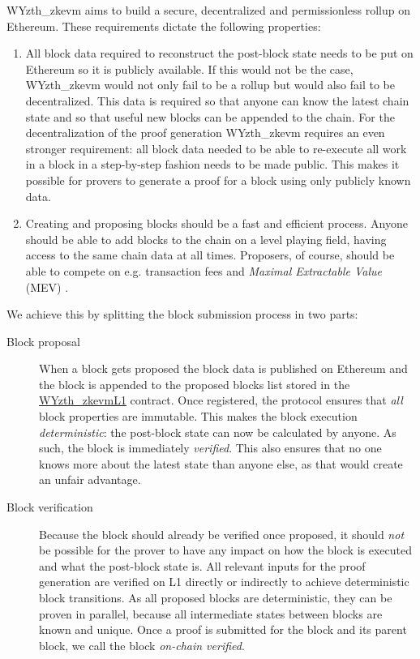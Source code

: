 \documentclass[9pt,oneside]{amsart}
\begin{document}
\begin{multicols}{2}
WYzth_zkevm aims to build a secure, decentralized and permissionless rollup on Ethereum. These requirements dictate the following properties:
\begin{enumerate}
\item All block data required to reconstruct the post-block state needs to be put on Ethereum so it is publicly available. If this would not be the case, WYzth_zkevm would not only fail to be a rollup but would also fail to be decentralized. This data is required so that anyone can know the latest chain state and so that useful new blocks can be appended to the chain. For the decentralization of the proof generation WYzth_zkevm requires an even stronger requirement: all block data needed to be able to re-execute all work in a block in a step-by-step fashion needs to be made public. This makes it possible for provers to generate a proof for a block using only publicly known data.
\item Creating and proposing blocks should be a fast and efficient process. Anyone should be able to add blocks to the chain on a level playing field, having access to the same chain data at all times. Proposers, of course, should be able to compete on e.g. transaction fees and \emph{Maximal Extractable Value} (MEV) \cite{mev}.
\end{enumerate}

We achieve this by splitting the block submission process in two parts:
\begin{description}
\item[Block proposal] When a block gets proposed the block data is published on Ethereum and the block is appended to the proposed blocks list stored in the \underline{WYzth_zkevmL1} contract. Once registered, the protocol ensures that \emph{all} block properties are immutable. This makes the block execution \emph{deterministic}: the post-block state can now be calculated by anyone. As such, the block is immediately \emph{verified}. This also ensures that no one knows more about the latest state than anyone else, as that would create an unfair advantage.
\item[Block verification] Because the block should already be verified once proposed, it should \emph{not} be possible for the prover to have any impact on how the block is executed and what the post-block state is. All relevant inputs for the proof generation are verified on L1 directly or indirectly to achieve deterministic block transitions. As all proposed blocks are deterministic, they can be proven in parallel, because all intermediate states between blocks are known and unique. Once a proof is submitted for the block and its parent block, we call the block \emph{on-chain verified}.
\end{description}


\end{multicols}
\end{document}
